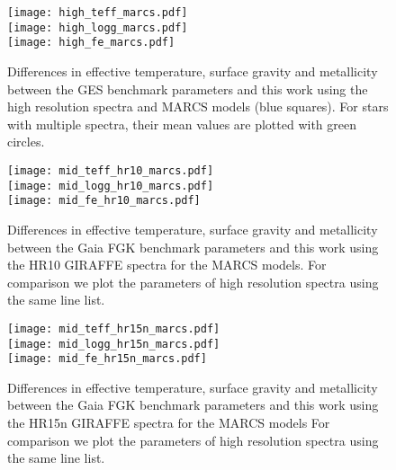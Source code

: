 \documentclass[fleqn,usenatbib]{mnras}
\begin{document}
\begin{figure}
  \centering
   \texttt{[image: high\_teff\_marcs.pdf]} \\
   \texttt{[image: high\_logg\_marcs.pdf]} \\
   \texttt{[image: high\_fe\_marcs.pdf]}
  \caption{Differences in effective temperature, surface gravity and metallicity between the GES benchmark parameters and this work using the high resolution spectra and MARCS models 
  (blue squares). For stars with multiple spectra, their mean values are plotted with green circles. }
  \label{high_res_marcs}
  \end{figure}
\begin{figure}
  \centering
   \texttt{[image: mid\_teff\_hr10\_marcs.pdf]} \\
   \texttt{[image: mid\_logg\_hr10\_marcs.pdf]} \\
   \texttt{[image: mid\_fe\_hr10\_marcs.pdf]}
  \caption{Differences in effective temperature, surface gravity and metallicity between the Gaia FGK benchmark parameters and this work using the HR10 GIRAFFE spectra for the MARCS models. For 
  comparison we plot the parameters of high resolution spectra using the same line list.}
  \label{mid_res_hr10_marcs}
  \end{figure}

\begin{figure}
  \centering
   \texttt{[image: mid\_teff\_hr15n\_marcs.pdf]} \\
   \texttt{[image: mid\_logg\_hr15n\_marcs.pdf]} \\
   \texttt{[image: mid\_fe\_hr15n\_marcs.pdf]}
  \caption{Differences in effective temperature, surface gravity and metallicity between the Gaia FGK benchmark parameters and this work using the HR15n GIRAFFE spectra for the MARCS models For 
  comparison we plot the parameters of high resolution spectra using the same line list.}
  \label{mid_res_hr15n_marcs}
  \end{figure}



\bsp	%
\label{lastpage}
\end{document}
